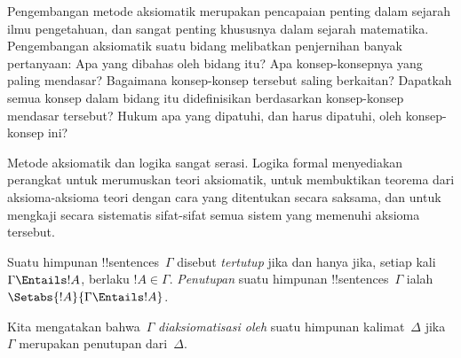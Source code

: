 \documentclass[../../../include/open-logic-section]{subfiles}
\begin{document}

\begin{explain}
Pengembangan metode aksiomatik merupakan pencapaian penting dalam sejarah
ilmu pengetahuan, dan sangat penting khususnya dalam sejarah matematika.
Pengembangan aksiomatik suatu bidang melibatkan penjernihan banyak pertanyaan:
Apa yang dibahas oleh bidang itu? Apa konsep-konsepnya yang paling mendasar?
Bagaimana konsep-konsep tersebut saling berkaitan? Dapatkah semua konsep dalam
bidang itu didefinisikan berdasarkan konsep-konsep mendasar tersebut? Hukum apa
yang dipatuhi, dan harus dipatuhi, oleh konsep-konsep ini?

Metode aksiomatik dan logika sangat serasi. Logika formal menyediakan
perangkat untuk merumuskan teori aksiomatik, untuk membuktikan teorema dari
aksioma-aksioma teori dengan cara yang ditentukan secara saksama, dan untuk
mengkaji secara sistematis sifat-sifat semua sistem yang memenuhi aksioma
tersebut.
\end{explain}

\begin{defn}
Suatu himpunan !!{sentence}s~$\Gamma$ disebut \emph{tertutup} jika dan hanya
jika, setiap kali $\Gamma \Entails !A$, berlaku $!A \in \Gamma$.
\emph{Penutupan} suatu himpunan !!{sentence}s~$\Gamma$ ialah
$\Setabs{!A}{\Gamma \Entails !A}$.

Kita mengatakan bahwa~$\Gamma$ \emph{diaksiomatisasi oleh} suatu himpunan
kalimat~$\Delta$ jika $\Gamma$ merupakan penutupan dari~$\Delta$.
\end{defn}
\end{document}
